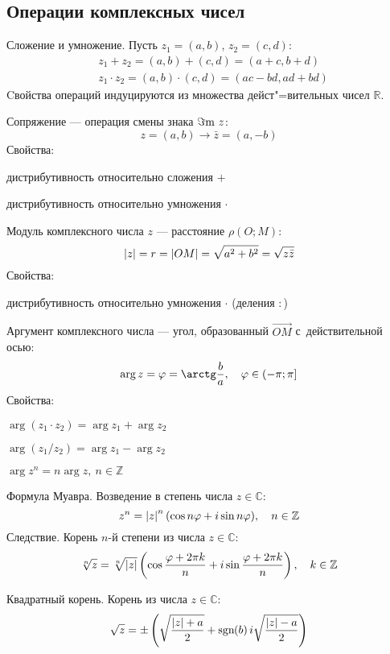 \subsection{Операции комплексных чисел}

\begin{theorem}
{\bold Сложение и умножение.} Пусть $z_1=(a,b)$, $z_2=(c,d)$:
$$\begin{aligned}
&z_1+z_2=(a,b)+(c,d)=(a+c,b+d)\\
&z_1\cdot z_2=(a,b)\cdot(c,d)=(ac-bd,ad+bd)
\end{aligned}$$
Cвойства операций {\ital индуцируются} из множества дейст"=вительных чисел $\mathbb{R}$. 
\end{theorem}

\begin{theorem}
{\bold Сопряжение} --- операция смены знака $\Im\text{m}\ z$:
$$z=(a,b)\to\bar{z}=(a,-b)$$
Свойства:
\begin{list*}
\item дистрибутивность относительно {\ital сложения} $+$
\item дистрибутивность относительно {\ital умножения} $\cdot$
\end{list*}
\end{theorem}
\begin{theorem}
{\bold Модуль} комплексного числа $z$ --- расстояние $\rho(O;M)$:
$$\left|z\right|=r=\left|OM\right|=\sqrt{a^2+b^2}=\sqrt{z\bar{z}}$$
Свойства:
\begin{list*}
\item дистрибутивность относительно {\ital умножения} $\cdot$ {\ital (деления $\colon$)}
\end{list*}
\end{theorem}
\begin{theorem}
{\bold Аргумент} комплексного числа --- угол, образованный $\overrightarrow{OM}$ с~действительной осью:
$$\arg z=\varphi=\arctg\frac{b}{a},\quad\varphi\in(-\pi;\pi]$$
Свойства:
\begin{list*}
\item $\arg(z_1\cdot z_2)=\arg z_1+\arg z_2$
\item $\arg(z_1\slash z_2)=\arg z_1-\arg z_2$
\item $\arg z^n=n\arg z,\ n\in\mathbb{Z}$
\end{list*}
\end{theorem}
\begin{theorem}
{\bold Формула Муавра.} Возведение в степень числа $z\in\mathbb{C}$:
$$z^n=\abs{z}^n(\cos n\varphi+i\sin n\varphi),\quad n\in\mathbb{Z}$$
{\bold Следствие.} Корень $n$-й степени из числа $z\in\mathbb{C}$:
$$\sqrt[n]{z}=\sqrt[n]{\abs{z}}\left(\cos\frac{\varphi+2\pi k}{n}+i\sin\frac{\varphi+2\pi k}{n}\right),\quad k\in\mathbb{Z}$$
\end{theorem}
\begin{theorem}
{\bold Квадратный корень.} Корень из числа $z\in\mathbb{C}$:
$$\sqrt{z}=\pm\left(\sqrt{\frac{\left|z\right|+a}{2}}+\text{sgn}\hspace*{-2pt}\left(b\right)i\sqrt{\frac{\left|z\right|-a}{2}}\right)$$
\end{theorem}

